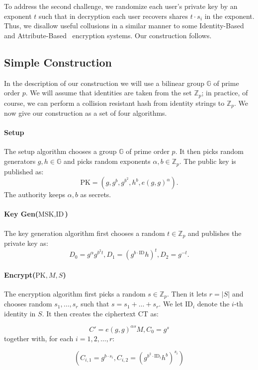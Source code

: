 \documentclass[a4paper, 11pt]{article}
\newcommand{\Z}{\ensuremath{\mathbb{Z}}}
\newcommand{\G}{\ensuremath{\mathbb{G}}}
\theoremstyle{definition}
\newcommand{\Zp}{\ensuremath{{\Z_p}}}
\newcommand{\MSK}{\ensuremath{\textrm{MSK}}}
\newcommand{\PK}{\ensuremath{\textrm{PK}}}
\newcommand{\ID}{\ensuremath{\textrm{ID}}}
\newcommand{\CT}{\ensuremath{\textrm{CT}}}
\begin{document}
To address the second challenge, we randomize each user's private key
by an exponent $t$ such that in decryption each user recovers shares
$t\cdot s_i$ in the exponent.  Thus, we disallow useful collusions in
a similar manner to some Identity-Based~\cite{chk03,bb04} and
Attribute-Based~\cite{sw05,GPSW06,BSW07} encryption systems. Our
construction follows.


\subsection{Simple Construction}
 In the description of our construction we will
use a bilinear group $\G$ of prime order $p$. We will assume that
identities are taken from the set $\Zp$; in practice, of course, we
can perform a collision resistant hash from identity strings to $\Zp$.
We now give our construction as a set of four algorithms.

\paragraph{Setup}
The setup algorithm chooses a group $\G$ of prime order $p$.
It then picks random generators $g,h \in \G$ and picks random
exponents $\alpha, b \in \Zp$. The public key is published as:
\[
\PK=( g,
g^{b},
g^{b^{2}},
h^{b},
e(g,g)^{\alpha} ).
\]
The authority keeps $\alpha, b$ as secrets.

\paragraph{Key Gen($\MSK,\ID$)}
The key generation algorithm first chooses a random $t \in \Zp$ and
publishes the private key as:
\[ D_0= g^{\alpha}g^{ b^2 t},
   D_1= (g^{b \cdot \ID}h)^{ t},
   D_2=  g^{-t}.
\]

\paragraph{Encrypt($\PK,M,S$)}
The encryption algorithm first picks a random $s \in \Zp$.
Then it lets $r=|S|$ and chooses random $s_1,\ldots, s_r$
such that $s=s_1+\ldots +s_r$.
We let $\ID_i$ denote the $i$-th identity in $S$.
It then creates the ciphertext $\CT$ as:

\[
C'=e(g,g)^{\alpha s}M, C_0= g^{s}
\]
together with, for each $i=1, 2, \dots, r$:

\[\left( C_{i,1}= g^{b \cdot s_i},
C_{i,2}= \left(g^{b^2 \cdot \ID_i}h^b\right)^{s_i} \right)
\]
\end{document}
